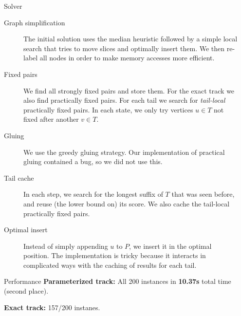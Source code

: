 \documentclass[final]{beamer}
\newlength{\sepwidth}
\newlength{\colwidth}
\newcommand{\separatorcolumn}{\begin{column}{\sepwidth}\end{column}}
\theoremstyle{remark}
\begin{document}
\begin{frame}[t]
\begin{columns}[t]
\begin{column}{\colwidth}
\begin{block}{Solver}
        \begin{description}
        \item[Graph simplification]
          The initial solution uses the median heuristic followed by a simple local search that tries to move
          slices and optimally insert them.
          We then re-label all nodes in order to make memory accesses more efficient.
        \item[Fixed pairs] We find all strongly fixed pairs and store them. For the
          exact track we also find practically fixed pairs.
          For each tail we search for \emph{tail-local} practically fixed pairs. In each state, we only
          try vertices $u\in T$ not fixed after another $v\in T$.
        \item[Gluing\quad] We use the greedy gluing strategy. Our implementation
          of practical gluing contained a bug, so we did not use this.
        \item[Tail cache] In each step, we search for the longest suffix of $T$ that
          was seen before, and reuse (the lower bound on) its score. We also
          cache the tail-local practically fixed pairs.
        \item[Optimal insert] Instead of simply appending $u$ to $P$, we
          insert it in the optimal position. The
          implementation is tricky because it interacts in complicated ways with
          the caching of results for each tail.
        \end{description}
      \end{block}

      \begin{block}{Performance}
        \textbf{Parameterized track:} All 200 instances in \textbf{10.37s} total
        time (second place).

        \textbf{Exact track:} 157/200 instanes.

      \end{block}


    \end{column}
    \separatorcolumn
  \end{columns}
\end{frame}
\end{document}

